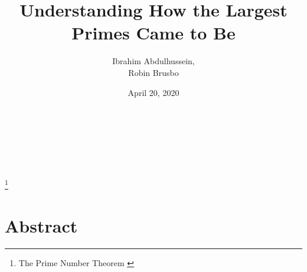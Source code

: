 \documentclass[a4paper, 12pt]{article}
\title{Understanding How the Largest Primes Came to Be}
\author{Ibrahim Abdulhussein, \\ Robin Brusbo}
\date{April 20, 2020}
\begin{document}
\makeatletter

\begin{titlepage}
    \thispagestyle{fancy}
    \renewcommand{\headrulewidth}{0pt}
    \renewcommand{\footrulewidth}{0pt}
    \cfoot{}
    \hbox{}\vfill
    \begin{center}
        {\LARGE\@title}\\[2em]
        {\large\@author}\\[1em]
        {\large\@date}\\[6em]
        \\
         \footnote{The Prime Number Theorem \cite{theorem:prime_num}}
    \end{center}
    \vspace{3cm}\vfill
\end{titlepage}

\makeatother

\newpage
\section*{Abstract}
\end{document}
